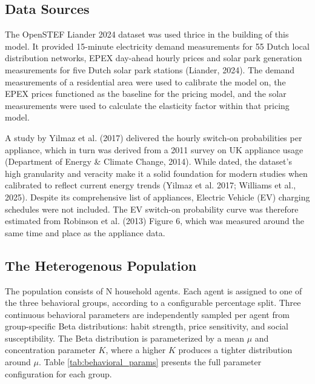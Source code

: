 \documentclass[11pt, a4paper]{article}
\begin{document}
\subsection{Data Sources} \label{subs:data}
The OpenSTEF Liander 2024 dataset was used thrice in the building of this model. 
It provided 15-minute electricity demand measurements for 55 Dutch local distribution networks, EPEX day-ahead hourly prices and solar park generation measurements for five Dutch solar park stations (Liander, 2024). The demand measurements of a residential area were used to calibrate the model on, the EPEX prices functioned as the baseline for the pricing model, and the solar measurements were used to calculate the elasticity factor within that pricing model. 

A study by Yilmaz et al. (2017) delivered the hourly switch-on probabilities per appliance, which in turn was derived from a 2011 survey on UK appliance usage (Department of Energy \& Climate Change, 2014). While dated, the dataset’s high granularity and veracity make it a solid foundation for modern studies when calibrated to reflect current energy trends (Yilmaz et al. 2017; Williams et al., 2025). Despite its comprehensive list of appliances, Electric Vehicle (EV) charging schedules were not included. The EV switch-on probability curve was therefore estimated from Robinson et al. (2013) Figure 6, which was measured around the same time and place as the appliance data.

\subsection{The Heterogenous Population} \label{subs:population}
The population consists of N household agents. Each agent is assigned to one of the three behavioral groups, according to a configurable percentage split. Three continuous behavioral parameters are independently sampled per agent from group-specific Beta distributions: habit strength, price sensitivity, and social susceptibility. The Beta distribution is parameterized by a mean $\mu$ and concentration parameter $K$, where a higher $K$ produces a tighter distribution around $\mu$. Table \ref{tab:behavioral_params} presents the full parameter configuration for each group.
\end{document}
